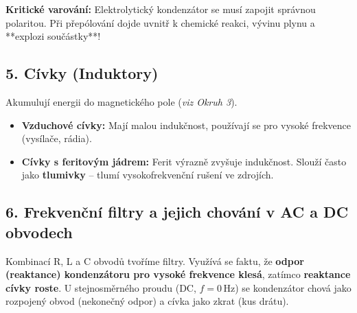 \documentclass[a4paper,10pt]{article}
\begin{document}
\begin{vysvetlenibox}
\begin{durazbox}
\textbf{Kritické varování:} Elektrolytický kondenzátor se musí zapojit správnou polaritou. Při přepólování dojde uvnitř k chemické reakci, vývinu plynu a **explozi součástky**!
\end{durazbox}

\subsection*{5. Cívky (Induktory)}

Akumulují energii do magnetického pole (\textit{viz Okruh 3}).
\begin{itemize}
    \item \textbf{Vzduchové cívky:} Mají malou indukčnost, používají se pro vysoké frekvence (vysílače, rádia).
    \item \textbf{Cívky s feritovým jádrem:} Ferit výrazně zvyšuje indukčnost. Slouží často jako \textbf{tlumivky} – tlumí vysokofrekvenční rušení ve zdrojích.
\end{itemize}

\subsection*{6. Frekvenční filtry a jejich chování v AC a DC obvodech}

Kombinací R, L a C obvodů tvoříme filtry. Využívá se faktu, že \textbf{odpor (reaktance) kondenzátoru pro vysoké frekvence klesá}, zatímco \textbf{reaktance cívky roste}. U stejnosměrného proudu (DC, $f=0\,\mathrm{Hz}$) se kondenzátor chová jako rozpojený obvod (nekonečný odpor) a cívka jako zkrat (kus drátu).

\begin{center}
\end{center}
\end{vysvetlenibox}
\end{document}
